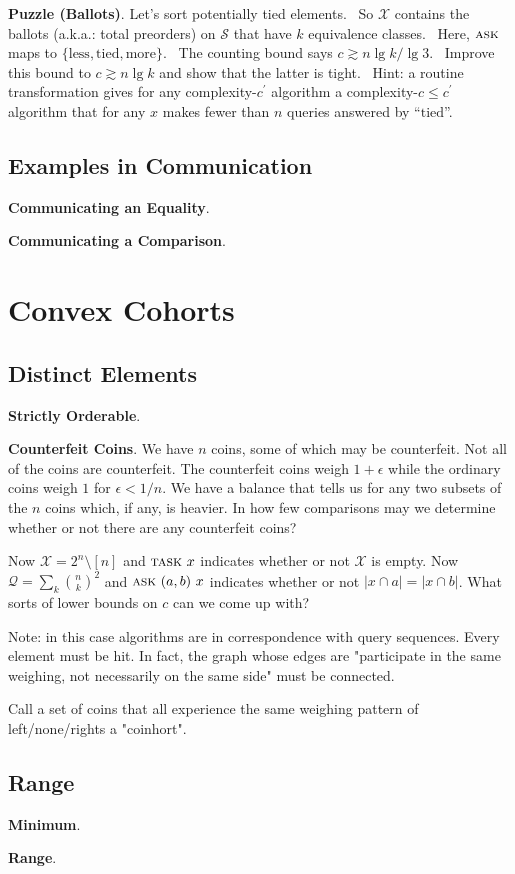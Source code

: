 \documentclass[11pt, justified]{tufte-book}
\newcommand{\Qq}{\mathcal{Q}}
\newcommand{\Ss}{\mathcal{S}}
\newcommand{\Xx}{\mathcal{X}}
\newcommand{\Task}{\textsc{task}}
\newcommand{\Ask}{\textsc{ask}}
\theoremstyle{definition}
\newcommand{\msec}[1]{{\let\clearpage\relax\chapter{\color{mblu}\textsf{#1}}}}
\newcommand{\msub}[1]{\vspace{0.3cm}\section{\color{mblu}\textsf{#1}}}
\newcommand{\mpar}[1]{\par\noindent\textbf{#1}.}
\begin{document}
        \mpar{Puzzle (Ballots)}
          Let's sort potentially tied elements.  So $\Xx$ contains the ballots
          (a.k.a.: total preorders) on $\Ss$ that have $k$ equivalence
          classes.  Here, $\Ask$ maps to $\{\text{less}, \text{tied},
          \text{more}\}$.  The counting bound says $c \gtrsim n\lg k / \lg 3$. 
          Improve this bound to $c \gtrsim n\lg k$ and show that the latter is
          tight.  Hint: a routine transformation gives for any
          complexity-$c^\prime$ algorithm a complexity-$c\leq c^\prime$
          algorithm that for any $x$ makes fewer than $n$ queries answered by
          ``$\text{tied}$''.

      \msub{Examples in Communication} %
        \mpar{Communicating an Equality}
        \mpar{Communicating a Comparison}


    \msec{Convex Cohorts}
      \msub{Distinct Elements}
        \mpar{Strictly Orderable}

        \mpar{Counterfeit Coins}
          We have $n$ coins, some of which may be counterfeit.  Not all of the
          coins are counterfeit.  The counterfeit coins weigh $1+\epsilon$
          while the ordinary coins weigh $1$ for $\epsilon < 1/n$.  We have a
          balance that tells us for any two subsets of the $n$ coins which, if
          any, is heavier.  In how few comparisons may we determine whether or
          not there are any counterfeit coins?

          Now $\Xx = 2^n \setminus [n]$ and $\Task \,\, x$ indicates whether or
          not $\Xx$ is empty.  Now $\Qq = \sum_{k} {n\choose
          k}^2$ and $\Ask \,\, (a,b) \,\, x$ indicates whether or not $|x\cap
          a| = |x \cap b|$.
          What sorts of lower bounds on $c$ can we come up with? 

          Note: in this case algorithms are in correspondence with query
          sequences.  Every element must be hit.  In fact, the graph whose
          edges are "participate in the same weighing, not necessarily on the
          same side" must be connected.

          Call a set of coins that all experience the same weighing pattern 
          of left/none/rights a "coinhort".  

      \msub{Range}
        \mpar{Minimum}
        \mpar{Range}
\end{document}
